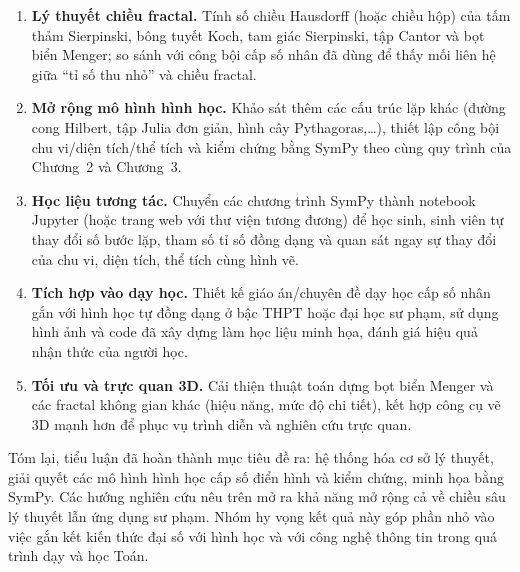 \documentclass[12pt,a4paper,oneside]{book}
\theoremstyle{theorem}
\theoremstyle{definition}
\begin{document}
\begin{enumerate}[leftmargin=1.5em, itemsep=4pt]
  \item \textbf{Lý thuyết chiều fractal.} Tính số chiều Hausdorff (hoặc chiều hộp) của tấm thảm Sierpinski, bông tuyết Koch, tam giác Sierpinski, tập Cantor và bọt biển Menger; so sánh với công bội cấp số nhân đã dùng để thấy mối liên hệ giữa ``tỉ số thu nhỏ'' và chiều fractal.

  \item \textbf{Mở rộng mô hình hình học.} Khảo sát thêm các cấu trúc lặp khác (đường cong Hilbert, tập Julia đơn giản, hình cây Pythagoras,\ldots), thiết lập công bội chu vi/diện tích/thể tích và kiểm chứng bằng SymPy theo cùng quy trình của Chương~2 và Chương~3.

  \item \textbf{Học liệu tương tác.} Chuyển các chương trình SymPy thành notebook Jupyter (hoặc trang web với thư viện tương đương) để học sinh, sinh viên tự thay đổi số bước lặp, tham số tỉ số đồng dạng và quan sát ngay sự thay đổi của chu vi, diện tích, thể tích cùng hình vẽ.

  \item \textbf{Tích hợp vào dạy học.} Thiết kế giáo án/chuyên đề dạy học cấp số nhân gắn với hình học tự đồng dạng ở bậc THPT hoặc đại học sư phạm, sử dụng hình ảnh và code đã xây dựng làm học liệu minh họa, đánh giá hiệu quả nhận thức của người học.

  \item \textbf{Tối ưu và trực quan 3D.} Cải thiện thuật toán dựng bọt biển Menger và các fractal không gian khác (hiệu năng, mức độ chi tiết), kết hợp công cụ vẽ 3D mạnh hơn để phục vụ trình diễn và nghiên cứu trực quan.
\end{enumerate}

\vspace{0.4em}
\noindent Tóm lại, tiểu luận đã hoàn thành mục tiêu đề ra: hệ thống hóa cơ sở lý thuyết, giải quyết các mô hình hình học cấp số điển hình và kiểm chứng, minh họa bằng SymPy. Các hướng nghiên cứu nêu trên mở ra khả năng mở rộng cả về chiều sâu lý thuyết lẫn ứng dụng sư phạm. Nhóm hy vọng kết quả này góp phần nhỏ vào việc gắn kết kiến thức đại số với hình học và với công nghệ thông tin trong quá trình dạy và học Toán.

\fontsize{13pt}{18pt}\selectfont
\setlength{\baselineskip}{26truept}
\end{document}
